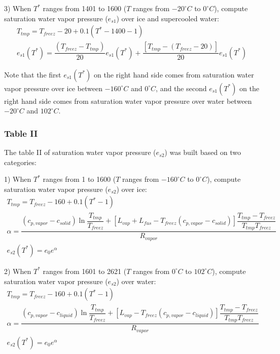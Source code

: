 \documentclass[letterpaper,titlepage,10pt]{article}
\numberwithin{equation}{section}
\begin{document}
3) When $T^*$ ranges from 1401 to 1600 ($T$ ranges from $-20^\circ C$ to $0^\circ C$), compute saturation water vapor pressure ($e_{s1}$) over ice and supercooled water:
\begin{gather}
	T_{tmp} = T_{freez} - 20 + 0.1\left( T^* - 1400 - 1 \right) \\
	e_{s1}(T^*) = \dfrac{\left(T_{freez} - T_{tmp} \right)}{20} e_{s1}(T^*) + \dfrac{\left[T_{tmp} - \left(T_{freez} - 20 \right) \right]}{20} e_{s1}(T^*)
\end{gather}

Note that the first $e_{s1}(T^*)$ on the right hand side comes from saturation water vapor pressure over ice between $-160^\circ C$ and $0^\circ C$, and the second $e_{s1}(T^*)$ on the right hand side comes from saturation water vapor pressure over water between $-20^\circ C$ and $102^\circ C$.


\subsubsection*{Table II}

The table II of saturation water vapor pressure ($e_{s2}$) was built based on two categories:

1) When $T^*$ ranges from 1 to 1600 ($T$ ranges from $-160^\circ C$ to $0^\circ C$), compute saturation water vapor pressure ($e_{s2}$) over ice:
\begin{gather}
	T_{tmp} = T_{freez} - 160 + 0.1\left( T^* - 1 \right) \\
	\alpha = {\dfrac{\left(c_{p,vapor} - c_{solid} \right) \ln \dfrac{T_{tmp}}{T_{freez}} + \left[L_{vap} + L_{fus} - T_{freez} \left(c_{p,vapor} - c_{solid} \right) \right] \dfrac{T_{tmp} - T_{freez}}{T_{tmp} T_{freez}}}{R_{vapor}}} \\
	e_{s2}(T^*) = e_0 e^{\alpha}
\end{gather}

2) When $T^*$ ranges from 1601 to 2621 ($T$ ranges from $0^\circ C$ to $102^\circ C$), compute saturation water vapor pressure ($e_{s2}$) over water:
\begin{gather}
	T_{tmp} = T_{freez} - 160 + 0.1\left( T^* - 1 \right) \\
	\alpha = {\dfrac{\left(c_{p,vapor} - c_{liquid} \right) \ln \dfrac{T_{tmp}}{T_{freez}} + \left[L_{vap} - T_{freez} \left(c_{p,vapor} - c_{liquid} \right) \right] \dfrac{T_{tmp} - T_{freez}}{T_{tmp} T_{freez}}}{R_{vapor}}} \\
	e_{s2}(T^*) = e_0 e^{\alpha}
\end{gather}
\end{document}
